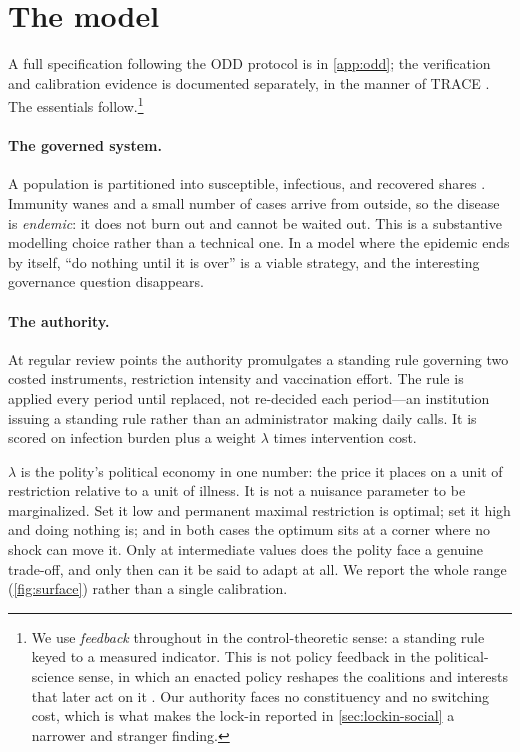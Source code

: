 \documentclass[11pt]{article}
\begin{document}
\section{The model}
\label{sec:model-social}

A full specification following the ODD protocol
\citep{grimm2006odd,grimm2010oddupdate,grimm2020odd} is in \cref{app:odd}; the verification and
calibration evidence is documented separately, in the manner of TRACE \citep{grimm2014trace}. The
essentials follow.\footnote{We use \emph{feedback} throughout in the control-theoretic sense: a
standing rule keyed to a measured indicator. This is not policy feedback in the political-science
sense, in which an enacted policy reshapes the coalitions and interests that later act on it
\citep{pierson2000increasing}. Our authority faces no constituency and no switching cost, which is
what makes the lock-in reported in \cref{sec:lockin-social} a narrower and stranger finding.}

\paragraph{The governed system.} A population is partitioned into susceptible, infectious, and
recovered shares \citep{kermack1927contribution}. Immunity wanes and a small number of cases arrive
from outside, so the disease is \emph{endemic}: it does not burn out and cannot be waited out. This
is a substantive modelling choice rather than a technical one. In a model where the epidemic ends by
itself, ``do nothing until it is over'' is a viable strategy, and the interesting governance question
disappears.

\paragraph{The authority.} At regular review points the authority promulgates a standing rule
governing two costed instruments, restriction intensity and vaccination effort. The rule is applied
every period until replaced, not re-decided each period---an institution issuing a standing rule
rather than an administrator making daily calls. It is scored on infection burden plus a weight
$\lambda$ times intervention cost.

$\lambda$ is the polity's political economy in one number: the price it places on a unit of
restriction relative to a unit of illness. It is not a nuisance parameter to be marginalized. Set it
low and permanent maximal restriction is optimal; set it high and doing nothing is; and in both
cases the optimum sits at a corner where no shock can move it. Only at intermediate values does the
polity face a genuine trade-off, and only then can it be said to adapt at all. We report the whole
range (\cref{fig:surface}) rather than a single calibration.
\end{document}
